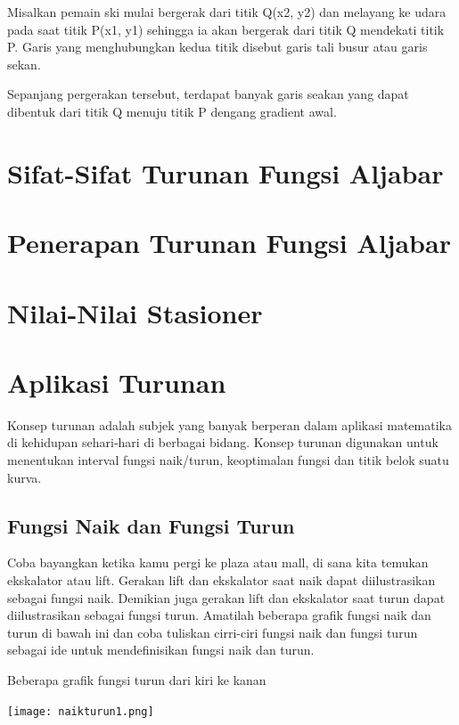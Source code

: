 \documentclass[11pt,fleqn]{book} %
\begin{document}
\noindent 
Misalkan pemain ski mulai bergerak dari titik Q(x2, y2) dan melayang ke udara pada saat titik P(x1, y1) sehingga ia akan bergerak dari titik Q mendekati titik P. Garis yang menghubungkan kedua titik disebut garis tali busur atau garis sekan.

\noindent 
Sepanjang pergerakan tersebut, terdapat banyak garis seakan yang dapat dibentuk dari titik Q menuju titik P dengang gradient awal.\\


\section{Sifat-Sifat Turunan Fungsi Aljabar}

\section{Penerapan Turunan Fungsi Aljabar}

\section{Nilai-Nilai Stasioner}

\section{Aplikasi Turunan}
Konsep turunan adalah subjek yang banyak berperan dalam aplikasi matematika di kehidupan sehari-hari di berbagai bidang. Konsep turunan digunakan untuk
menentukan interval fungsi naik/turun, keoptimalan fungsi dan titik belok suatu kurva.
\subsection{Fungsi Naik dan Fungsi Turun}
Coba bayangkan ketika kamu pergi ke plaza atau mall, di sana kita temukan ekskalator atau lift. Gerakan lift dan ekskalator saat naik dapat diilustrasikan sebagai fungsi naik. Demikian juga gerakan lift dan ekskalator saat turun dapat diilustrasikan sebagai fungsi turun. Amatilah beberapa grafik fungsi naik dan turun di bawah ini dan coba tuliskan cirri-ciri fungsi naik dan fungsi turun sebagai ide untuk mendefinisikan fungsi naik dan turun.

Beberapa grafik fungsi turun dari kiri ke kanan

\texttt{[image: naikturun1.png]}
\end{document}
